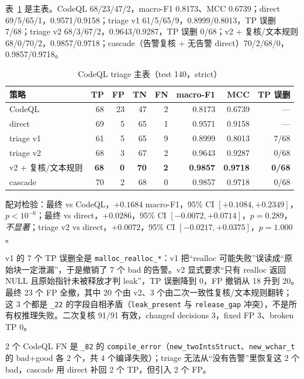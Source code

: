 \documentclass[conference]{IEEEtran}
\newcommand{\best}[1]{\textbf{#1}}
\begin{document}
表~\ref{tab:triage} 是主表。CodeQL 68/23/47/2，macro-F1 0.8173、MCC 0.6739；direct 69/5/65/1，0.9571/0.9158；triage v1 61/5/65/9，0.8999/0.8013，TP 误删 7/68；triage v2 68/3/67/2，0.9643/0.9287，TP 误删 0/68；v2 + 复核/文本规则 68/0/70/2，0.9857/0.9718；cascade（告警复核 + 无告警 direct）70/2/68/0，0.9857/0.9718。

\begin{table}[t]
\centering
\caption{CodeQL triage 主表（test 140，strict）}
\label{tab:triage}
\footnotesize
\setlength{\tabcolsep}{4pt}
\begin{tabular}{@{}lrrrrrrr@{}}
\toprule
策略 & TP & FP & TN & FN & macro-F1 & MCC & TP 误删 \\
\midrule
CodeQL & 68 & 23 & 47 & 2 & 0.8173 & 0.6739 & --- \\
direct & 69 & 5 & 65 & 1 & 0.9571 & 0.9158 & --- \\
triage v1 & 61 & 5 & 65 & 9 & 0.8999 & 0.8013 & 7/68 \\
triage v2 & 68 & 3 & 67 & 2 & 0.9643 & 0.9287 & 0/68 \\
v2 + 复核/文本规则 & \best{68} & \best{0} & \best{70} & \best{2} & \best{0.9857} & \best{0.9718} & \best{0/68} \\
cascade & 70 & 2 & 68 & 0 & 0.9857 & 0.9718 & 0/68 \\
\bottomrule
\end{tabular}
\end{table}

配对检验：最终 vs CodeQL，$+0.1684$ macro-F1，95\% CI $[+0.1084,+0.2349]$，$p<10^{-6}$；最终 vs direct，$+0.0286$，95\% CI $[-0.0072,+0.0714]$，$p=0.289$，\emph{不显著}；triage v2 vs direct，$+0.0072$，95\% CI $[-0.0217,+0.0375]$，$p=1.000$。

v1 的 7 个 TP 误删全是 \texttt{malloc\_realloc\_*}：v1 把“realloc 可能失败”误读成“原始块一定泄漏”，于是撤销了 7 个 bad 的告警。v2 显式要求“只有 realloc 返回 NULL 且原始指针未被释放才判 leak”，TP 误删降到 0，FP 撤销从 18 升到 20。最终 23 个 FP 全撤，其中 20 个由 v2、3 个由二次一致性复核/文本规则翻转；这 3 个都是 \texttt{\_22} 的字段自相矛盾（\texttt{leak\_present} 与 \texttt{release\_gap} 冲突），不是所有权推理失败。二次复核 91/91 有效，changed decisions 3，fixed FP 3、broken TP 0。

2 个 CodeQL FN 是 \texttt{\_82} 的 \texttt{compile\_error}（\texttt{new\_twoIntsStruct}、\texttt{new\_wchar\_t} 的 bad+good 各 2 个，共 4 个编译失败）；triage 无法从“没有告警”里恢复这 2 个 bad，cascade 用 direct 补回 2 个 TP，但引入 2 个 FP。
\end{document}
